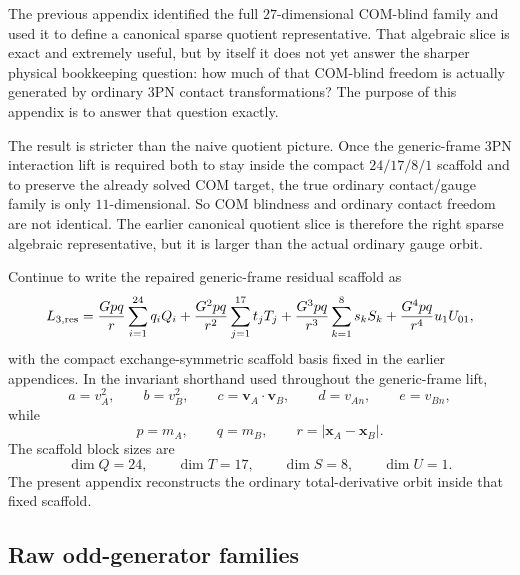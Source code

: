 \documentclass[11pt]{article}
\begin{document}
The previous appendix identified the full $27$-dimensional COM-blind family and
used it to define a canonical sparse quotient representative.  That algebraic
slice is exact and extremely useful, but by itself it does not yet answer the
sharper physical bookkeeping question: how much of that COM-blind freedom is
actually generated by ordinary $3$PN contact transformations?  The purpose of
this appendix is to answer that question exactly.

The result is stricter than the naive quotient picture.  Once the generic-frame
$3$PN interaction lift is required both to stay inside the compact
$24/17/8/1$ scaffold and to preserve the already solved COM target, the true
ordinary contact/gauge family is only $11$-dimensional.  So COM blindness and
ordinary contact freedom are not identical.  The earlier canonical quotient
slice is therefore the right sparse algebraic representative, but it is larger
than the actual ordinary gauge orbit.

Continue to write the repaired generic-frame residual scaffold as
\begin{equation}
L_{3,\rm res}
=
\frac{Gpq}{r}\sum_{i=1}^{24} q_i Q_i
+\frac{G^2pq}{r^2}\sum_{j=1}^{17} t_j T_j
+\frac{G^3pq}{r^3}\sum_{k=1}^{8} s_k S_k
+\frac{G^4pq}{r^4}u_1 U_{01},
\label{eq:app-gauge-orbit-residual-scaffold}
\end{equation}
with the compact exchange-symmetric scaffold basis fixed in the earlier
appendices.  In the invariant shorthand used throughout the generic-frame lift,
\begin{equation}
 a=v_A^2,
 \qquad
 b=v_B^2,
 \qquad
 c=\mathbf v_A\!\cdot\!\mathbf v_B,
 \qquad
 d=v_{An},
 \qquad
 e=v_{Bn},
\label{eq:app-gauge-orbit-abcde}
\end{equation}
while
\begin{equation}
 p=m_A,
 \qquad
 q=m_B,
 \qquad
 r=|\mathbf x_A-\mathbf x_B|.
\label{eq:app-gauge-orbit-pqr}
\end{equation}
The scaffold block sizes are
\begin{equation}
\boxed{\dim Q=24,
\qquad
\dim T=17,
\qquad
\dim S=8,
\qquad
\dim U=1.}
\label{eq:app-gauge-orbit-scaffold-sizes}
\end{equation}
The present appendix reconstructs the ordinary total-derivative orbit inside
that fixed scaffold.

\subsection{Raw odd-generator families}
\label{app:gauge-orbit-raw}
\end{document}

